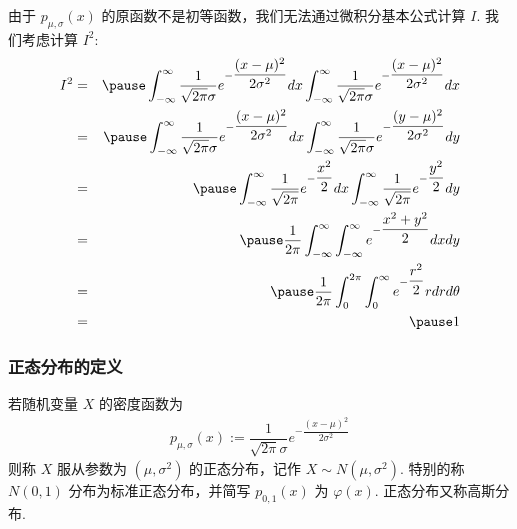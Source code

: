 \begin{frame}
	\vspace{0.4cm}
	由于 $p_{\mu,\sigma}(x)$ 的原函数不是初等函数，我们无法通过微积分基本公式计算 $I$. 我们考虑计算 $I^2$:
	\begin{eqnarray*}
		I^2&=&\pause \int_{-\infty}^\infty \dfrac{1}{\sqrt{2\pi}\sigma}e^{-\dfrac{(x-\mu)^2}{2\sigma^2}}dx\int_{-\infty}^\infty \dfrac{1}{\sqrt{2\pi}\sigma}e^{-\dfrac{(x-\mu)^2}{2\sigma^2}}dx\\
		&=&\pause \int_{-\infty}^\infty \dfrac{1}{\sqrt{2\pi}\sigma}e^{-\dfrac{(x-\mu)^2}{2\sigma^2}}dx\int_{-\infty}^\infty \dfrac{1}{\sqrt{2\pi}\sigma}e^{-\dfrac{(y-\mu)^2}{2\sigma^2}}dy\\
		&=&\pause \int_{-\infty}^\infty\dfrac{1}{\sqrt{2\pi}}e^{-\dfrac{x^2}{2}}dx\int_{-\infty}^\infty\dfrac{1}{\sqrt{2\pi}}e^{-\dfrac{y^2}{2}}dy\\
		&=&\pause \dfrac{1}{2\pi}\int_{-\infty}^\infty\int_{-\infty}^\infty e^{-\dfrac{x^2+y^2}{2}}dxdy\\
		&=&\pause \dfrac{1}{2\pi}\int_0^{2\pi}\int_0^\infty e^{-\dfrac{r^2}{2}}rdrd\theta\\
		&=&\pause 1
	\end{eqnarray*}


\end{frame}
\begin{frame}
	\frametitle{正态分布的定义}
	\begin{defi}
		若随机变量 $X$ 的密度函数为
		\begin{eqnarray*}
			p_{\mu,\sigma}(x):=\dfrac{1}{\sqrt{2\pi}\sigma}e^{-\dfrac{(x-\mu)^2}{2\sigma^2}}
		\end{eqnarray*}
		则称 $X$ 服从参数为 $(\mu,\sigma^2)$ 的正态分布，记作 $X\sim N (\mu,\sigma^2)$. 特别的称 $N (0,1)$ 分布为标准正态分布，并简写 $p_{0,1}(x)$ 为 $\varphi (x)$. 正态分布又称高斯分布.
	\end{defi}
\end{frame}

